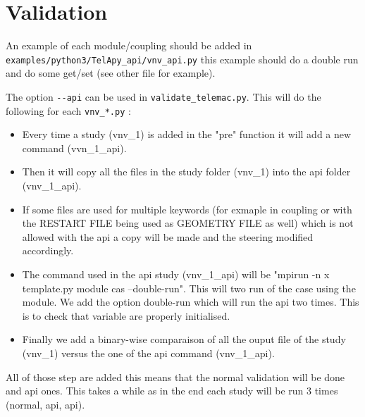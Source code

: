 \section{Validation}
%
An example of each module/coupling should be added in
\verb!examples/python3/TelApy_api/vnv_api.py! this example should do a double
run and do some get/set (see other file for example).

The option \verb!--api! can be used in \verb!validate_telemac.py!. This will do
the following for each \verb!vnv_*.py! :
\begin{itemize}
  \item Every time a study (vnv\_1) is added in the "pre" function it will add a
    new command (vvn\_1\_api).
  \item Then it will copy all the files in the study folder (vnv\_1) into the
    api folder (vnv\_1\_api).
  \item If some files are used for multiple keywords (for exmaple in coupling
    or with the RESTART FILE being used as GEOMETRY FILE as well) which is not
    allowed with the api a copy will be made and the steering modified
    accordingly.
  \item The command used in the api study (vnv\_1\_api) will be "mpirun -n x
    template.py module cas --double-run". This will two run of the case using
    the \TelApy{} module. We add the option double-run which will run the api two
    times. This is to check that variable are properly initialised.
  \item Finally we add a binary-wise comparaison of all the ouput file of the
    study (vnv\_1) versus the one of the api command (vnv\_1\_api).
\end{itemize}

All of those step are added this means that the normal validation will be done
and api ones. This takes a while as in the end each study will be run 3
times (normal, api, api).

